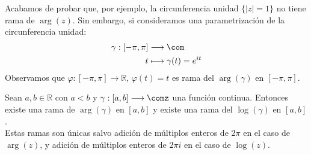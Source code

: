 \begin{obs}
Acabamos de probar que, por ejemplo, la circunferencia unidad $\{ |z| = 1 \}$ no tiene rama de $\arg(z)$. Sin embargo, si consideramos una parametrización de la circunferencia unidad:
\begin{align*}
    \gamma : [-\pi, \pi] &\longrightarrow \com \\
    t &\longmapsto \gamma(t) = e^{it}
\end{align*}
Observamos que $\varphi : [-\pi, \pi] \longrightarrow \mathbb{R}$, $\varphi(t) = t$ es rama del $\arg(\gamma)$ en $[-\pi,\pi]$.
\end{obs}

\begin{teo}
Sean $a,b \in \mathbb{R}$ con $a < b$ y $\gamma : [a,b] \longrightarrow \comz$ una función continua. Entonces existe una rama de $\arg(\gamma)$ en $[a,b]$ y existe una rama del $\log(\gamma)$ en $[a,b]$.
\\
\newline
Estas ramas son únicas salvo adición de múltiplos enteros de $2\pi$ en el caso de $\arg(z)$, y adición de múltiplos enteros de $2\pi i$ en el caso de $\log(z)$.
\end{teo}

